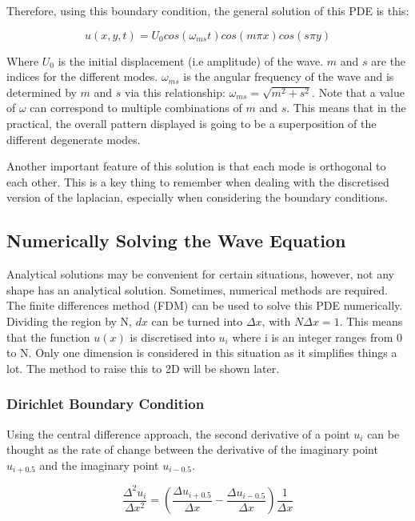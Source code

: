 Therefore, using this boundary condition, the general solution of this PDE is this:

\begin{equation}
    u(x,y,t) = U_0 cos(\omega_{ms}t)cos(m\pi x)cos(s\pi y)
\end{equation}

Where $U_0$ is the initial displacement (i.e amplitude) of the wave. $m$ and $s$ are the indices for the different modes. $\omega_{ms}$ is the angular frequency of the wave and is determined by $m$ and $s$ via this relationship: $\omega_{ms} = \sqrt{m^2+s^2}$. Note that a value of $\omega$ can correspond to multiple combinations of $m$ and $s$. This means that in the practical, the overall pattern displayed is going to be a superposition of the different degenerate modes.

Another important feature of this solution is that each mode is orthogonal to each other. This is a key thing to remember when dealing with the discretised version of the laplacian, especially when considering the boundary conditions.

\subsection{Numerically Solving the Wave Equation}
Analytical solutions may be convenient for certain situations, however, not any shape has an analytical solution. Sometimes, numerical methods are required. The finite differences method (FDM) can be used to solve this PDE numerically. Dividing the region by N, $dx$ can be turned into $\Delta x$, with $N\Delta x = 1$. This means that the function $u(x)$ is discretised into $u_i$ where i is an integer ranges from 0 to N. Only one dimension is considered in this situation as it simplifies things a lot. The method to raise this to 2D will be shown later.

\subsubsection{Dirichlet Boundary Condition}
Using the central difference approach, the second derivative of a point $u_i$ can be thought as the rate of change between the derivative of the imaginary point $u_{i+0.5}$ and the imaginary point $u_{i-0.5}$.

\begin{equation}
    \frac{\Delta^2 u_i}{\Delta x^2} = (\frac{\Delta u_{i+0.5}}{\Delta x} - \frac{\Delta u_{i-0.5}}{\Delta x}) \frac{1}{\Delta x} \label{eq:centraldiff}
\end{equation}

